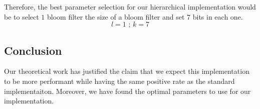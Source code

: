 Therefore, the best parameter selection for our hierarchical implementation would be to select $1$ bloom filter the size of a bloom filter and set $7$ bits in each one.
$$l = 1\text{ ; } k = 7$$

\subsection{Conclusion}
Our theoretical work has justified the claim that we expect this implementation to be more performant while having the same positive rate as the standard implementaiton.
Moreover, we have found the optimal parameters to use for our implementation.
